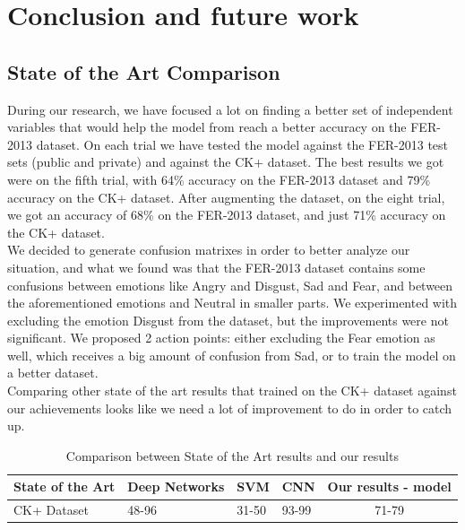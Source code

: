 \documentclass[runningheads,a4paper,11pt]{report}
\begin{document}
\chapter{Conclusion and future work}
\label{chapter:conclusions}

\section{State of the Art Comparison}
\label{section:soa_analysis}

During our research, we have focused a lot on finding a better set of independent variables that would help the model from \cite{Arriaga17} reach a better accuracy on the FER-2013 dataset. On each trial we have tested the model against the FER-2013 test sets (public and private) and against the CK+ dataset. The best results we got were on the fifth trial, with 64\% accuracy on the FER-2013 dataset and 79\% accuracy on the CK+ dataset. After augmenting the dataset, on the eight trial, we got an accuracy of 68\% on the FER-2013 dataset, and just 71\% accuracy on the CK+ dataset. \\
We decided to generate confusion matrixes in order to better analyze our situation, and what we found was that the FER-2013 dataset contains some confusions between emotions like Angry and Disgust, Sad and Fear, and between the aforementioned emotions and Neutral in smaller parts. We experimented with excluding the emotion Disgust from the dataset, but the improvements were not significant. We proposed 2 action points: either excluding the Fear emotion as well, which receives a big amount of confusion from Sad, or to train the model on a better dataset.\\
Comparing other state of the art results that trained on the CK+ dataset against our achievements looks like we need a lot of improvement to do in order to catch up.

\begin{table}[htbp]
	\caption{Comparison between State of the Art results and our results}
	\label{state_of_the_art_comparison}
		\begin{center}
			\begin{tabular}{p{100pt}p{100pt}p{60pt}p{60pt}c}
				\textbf{State of the Art}& \textbf{Deep Networks \cite{Samadiani19}}& \textbf{SVM \cite{Samadiani19}}& \textbf{CNN \cite{Burkert16}}& \textbf{Our results - model \cite{Arriaga17}} \\
				\hline\hline
				CK+ Dataset& 48-96& 31-50& 93-99& 71-79 \\
				\hline
			\end{tabular}
		\end{center}
\end{table}
\end{document}
